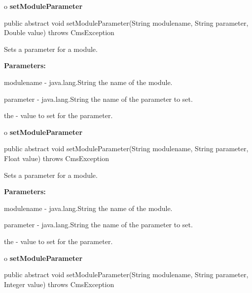 o {\bf setModuleParameter} 

\begin{PRE}
 public abstract void setModuleParameter(String modulename,
                                         String parameter,
                                         Double value) throws CmsException
\end{PRE}

\begin{description}
\htmlDD Sets a parameter for a module. 

\begin{description}
\item {\bf Parameters:}  

modulename - java.lang.String the name of the module.  

parameter - java.lang.String the name of the parameter to set.  

the - value to set for the parameter.  
\end{description}

\end{description}

o {\bf setModuleParameter} 

\begin{PRE}
 public abstract void setModuleParameter(String modulename,
                                         String parameter,
                                         Float value) throws CmsException
\end{PRE}

\begin{description}
\htmlDD Sets a parameter for a module. 

\begin{description}
\item {\bf Parameters:}  

modulename - java.lang.String the name of the module.  

parameter - java.lang.String the name of the parameter to set.  

the - value to set for the parameter.  
\end{description}

\end{description}

o {\bf setModuleParameter} 

\begin{PRE}
 public abstract void setModuleParameter(String modulename,
                                         String parameter,
                                         Integer value) throws CmsException
\end{PRE}

